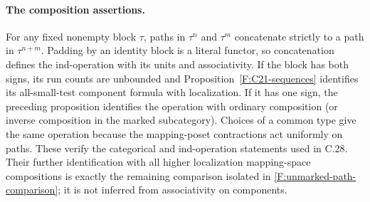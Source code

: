 \paragraph{The composition assertions.}
For any fixed nonempty block $\tau$, paths in $\tau^n$ and
$\tau^m$ concatenate strictly to a path in $\tau^{n+m}$.
Padding by an identity block is a literal functor, so concatenation
defines the ind-operation with its units and associativity.
If the block has both signs, its run counts are unbounded and
Proposition~\ref{F:C21-sequences} identifies its all-small-test
component formula with localization. If it has one sign, the
preceding proposition identifies the operation with ordinary
composition (or inverse composition in the marked subcategory).
Choices of a common type give the same operation because the
mapping-poset contractions act uniformly on paths. These verify
the categorical and ind-operation statements used in C.28.
Their further identification with all higher localization
mapping-space compositions is exactly the remaining comparison
isolated in \ref{F:unmarked-path-comparison}; it is not inferred
from associativity on components.
